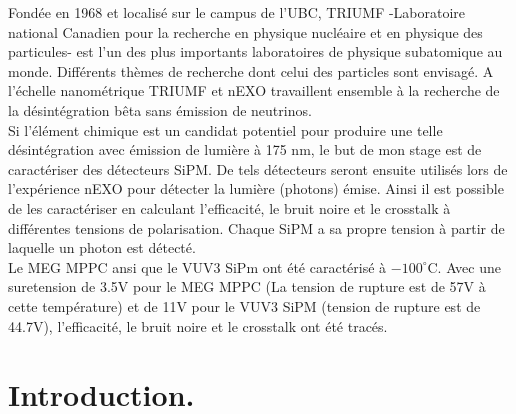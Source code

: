\documentclass[a4paper, 11pt]{report}%
\begin{document}
   Fond\'ee en 1968 et localis\'e sur le campus de l'UBC, TRIUMF -Laboratoire national Canadien pour la recherche en physique nucl\'eaire et en physique des 
   particules- est l'un des plus importants laboratoires de physique subatomique au monde. Diff\'erents th\`emes de recherche dont celui des particles 
   sont envisag\'e. A l'\'echelle nanom\'etrique TRIUMF et nEXO travaillent ensemble \`a la recherche de la d\'esint\'egration bêta sans émission
   de neutrinos. 
   \\
   Si l'\'el\'ement chimique  est un candidat potentiel pour produire une telle d\'esint\'egration avec \'emission de lumi\`ere \`a 175 nm, le but de mon 
   stage est de caract\'eriser des d\'etecteurs SiPM. De tels d\'etecteurs seront ensuite utilis\'es lors de l'exp\'erience nEXO pour d\'etecter la lumi\`ere
   (photons) \'emise. Ainsi il est possible de les caract\'eriser en calculant l'efficacit\'e, le bruit noire et le crosstalk à diff\'erentes tensions de polarisation. 
   Chaque SiPM a sa propre tension à partir de laquelle un photon est d\'etect\'e. 
   \\
   Le MEG MPPC ansi que le VUV3 SiPm ont \'et\'e caract\'eris\'e \`a $-100^\circ$C. Avec une suretension de 3.5V pour le MEG MPPC (La tension de rupture est 
   de 57V à cette temp\'erature) et de 11V pour le VUV3 SiPM (tension de rupture est de 44.7V), l'efficacit\'e, le bruit noire et le crosstalk ont \'et\'e
   trac\'es. 
   

\thispagestyle{empty}
\tableofcontents 




\thispagestyle{empty}
\listoffigures



\chapter{Introduction.}
\end{document}
